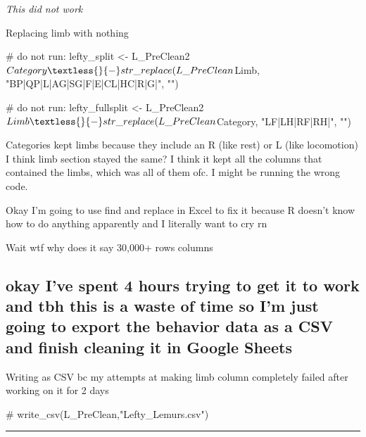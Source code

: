 \documentclass[
  letterpaper,
  DIV=11,
  numbers=noendperiod]{scrartcl}
\newenvironment{Shaded}{\begin{snugshade}}{\end{snugshade}}
\newcommand{\CommentTok}[1]{\textcolor[rgb]{0.37,0.37,0.37}{#1}}
\begin{document}
\emph{This did not work}

Replacing limb with nothing

\begin{Shaded}
\begin{Highlighting}[]
\CommentTok{\# do not run: lefty\_split \textless{}{-} L\_PreClean2$Category \textless{}{-} str\_replace(L\_PreClean$Limb, "BP|QP|L|AG|SG|F|E|CL|HC|R|G|", "")}

\CommentTok{\# do not run: lefty\_fullsplit \textless{}{-} L\_PreClean2$Limb \textless{}{-} str\_replace(L\_PreClean$Category, "LF|LH|RF|RH|", "")}
\end{Highlighting}
\end{Shaded}

Categories kept limbs because they include an R (like rest) or L (like
locomotion) I think limb section stayed the same? I think it kept all
the columns that contained the limbs, which was all of them ofc. I might
be running the wrong code.

Okay I'm going to use find and replace in Excel to fix it because R
doesn't know how to do anything apparently and I literally want to cry
rn

Wait wtf why does it say 30,000+ rows columns

\hypertarget{okay-ive-spent-4-hours-trying-to-get-it-to-work-and-tbh-this-is-a-waste-of-time-so-im-just-going-to-export-the-behavior-data-as-a-csv-and-finish-cleaning-it-in-google-sheets}{%
\subsection{okay I've spent 4 hours trying to get it to work and tbh
this is a waste of time so I'm just going to export the behavior data as
a CSV and finish cleaning it in Google
Sheets}\label{okay-ive-spent-4-hours-trying-to-get-it-to-work-and-tbh-this-is-a-waste-of-time-so-im-just-going-to-export-the-behavior-data-as-a-csv-and-finish-cleaning-it-in-google-sheets}}

Writing as CSV bc my attempts at making limb column completely failed
after working on it for 2 days

\begin{Shaded}
\begin{Highlighting}[]
\CommentTok{\# write\_csv(L\_PreClean,"Lefty\_Lemurs.csv")}
\end{Highlighting}
\end{Shaded}

\begin{center}\rule{0.5\linewidth}{0.5pt}\end{center}
\end{document}
